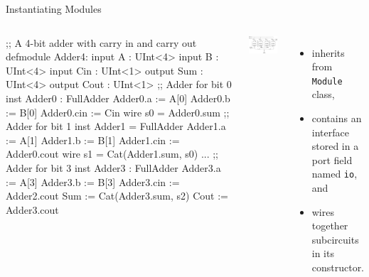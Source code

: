 \documentclass[xcolor=pdflatex,dvipsnames,table]{beamer}
\begin{document}
\begin{frame}[fragile]{Instantiating Modules}

\begin{columns}


{
\begin{stanza}
;; A 4-bit adder with carry in and carry out
defmodule Adder4:
  input A : UInt<4>
  input B : UInt<4>
  input Cin : UInt<1>
  output Sum : UInt<4>
  output Cout : UInt<1>
  ;; Adder for bit 0
  inst Adder0 : FullAdder
  Adder0.a   := A[0]
  Adder0.b   := B[0]
  Adder0.cin := Cin
  wire s0 = Adder0.sum
  ;; Adder for bit 1
  inst Adder1 = FullAdder
  Adder1.a   := A[1]
  Adder1.b   := B[1]
  Adder1.cin := Adder0.cout
  wire s1 = Cat(Adder1.sum, s0)
  ...
  ;; Adder for bit 3
  inst Adder3 : FullAdder
  Adder3.a   := A[3]
  Adder3.b   := B[3]
  Adder3.cin := Adder2.cout
  Sum  := Cat(Adder3.sum, s2)
  Cout := Adder3.cout
\end{stanza}
}


\begin{center}
\includegraphics[width=0.9\textwidth]{../getting-started/figs/4_Bit_Adder.jpg}
\end{center}

\begin{itemize}
\item inherits from \verb+Module+ class,
\item contains an interface stored in a port field named \verb+io+, and
\item wires together subcircuits in its constructor.
\end{itemize}

\end{columns}

\end{frame}
\end{document}

